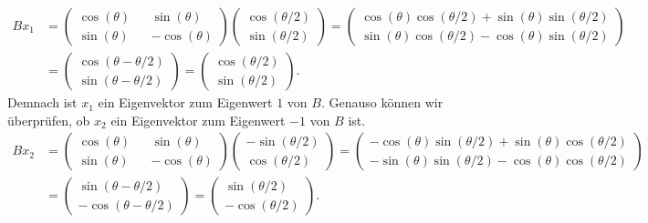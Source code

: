 \begin{align*}
	Bx_1 &= \begin{pmatrix}
		\cos(\theta) && \sin(\theta) \\
		\sin(\theta) && -\cos(\theta)
	\end{pmatrix} \begin{pmatrix}
		\cos(\theta/2) \\
		\sin(\theta/2)
	\end{pmatrix} = \begin{pmatrix}
		\cos(\theta)\cos(\theta/2)+\sin(\theta)\sin(\theta/2) \\
		\sin(\theta)\cos(\theta/2)-\cos(\theta)\sin(\theta/2)
	\end{pmatrix} \\ &= \begin{pmatrix}
		\cos(\theta - \theta/2) \\
		\sin(\theta - \theta/2)
	\end{pmatrix} = \begin{pmatrix}
		\cos(\theta/2) \\
		\sin(\theta/2)
	\end{pmatrix}.
\end{align*}
Demnach ist $x_1$ ein Eigenvektor zum Eigenwert $1$ von $B$. Genauso können wir überprüfen, ob $x_2$ ein Eigenvektor zum Eigenwert $-1$ von $B$ ist.
\begin{align*}
	Bx_2 &= \begin{pmatrix}
		\cos(\theta) && \sin(\theta) \\
		\sin(\theta) && -\cos(\theta)
	\end{pmatrix} \begin{pmatrix}
		-\sin(\theta/2) \\
		\cos(\theta/2)
	\end{pmatrix} = \begin{pmatrix}
		-\cos(\theta)\sin(\theta/2)+\sin(\theta)\cos(\theta/2) \\
		-\sin(\theta)\sin(\theta/2)-\cos(\theta)\cos(\theta/2)
	\end{pmatrix} \\ &= \begin{pmatrix}
		\sin(\theta - \theta/2) \\
		-\cos(\theta - \theta/2)
	\end{pmatrix} = \begin{pmatrix}
		\sin(\theta/2) \\
		-\cos(\theta/2)
	\end{pmatrix}.
\end{align*}
